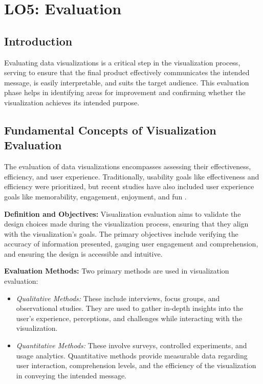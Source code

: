 \section{LO5: Evaluation}

\subsection{Introduction}
Evaluating data visualizations is a critical step in the visualization process, serving to ensure that the final product effectively communicates the intended message, is easily interpretable, and suits the target audience. This evaluation phase helps in identifying areas for improvement and confirming whether the visualization achieves its intended purpose.

\subsection{Fundamental Concepts of Visualization Evaluation}
The evaluation of data visualizations encompasses assessing their effectiveness, efficiency, and user experience. Traditionally, usability goals like effectiveness and efficiency were prioritized, but recent studies have also included user experience goals like memorability, engagement, enjoyment, and fun \cite{saketUsabilityPerformanceReview2016}.

\textbf{Definition and Objectives:} Visualization evaluation aims to validate the design choices made during the visualization process, ensuring that they align with the visualization’s goals. The primary objectives include verifying the accuracy of information presented, gauging user engagement and comprehension, and ensuring the design is accessible and intuitive.

\textbf{Evaluation Methods:} Two primary methods are used in visualization evaluation:

\begin{itemize}
    \item \textit{Qualitative Methods:} These include interviews, focus groups, and observational studies. They are used to gather in-depth insights into the user's experience, perceptions, and challenges while interacting with the visualization.
    \item \textit{Quantitative Methods:} These involve surveys, controlled experiments, and usage analytics. Quantitative methods provide measurable data regarding user interaction, comprehension levels, and the efficiency of the visualization in conveying the intended message.
\end{itemize}

